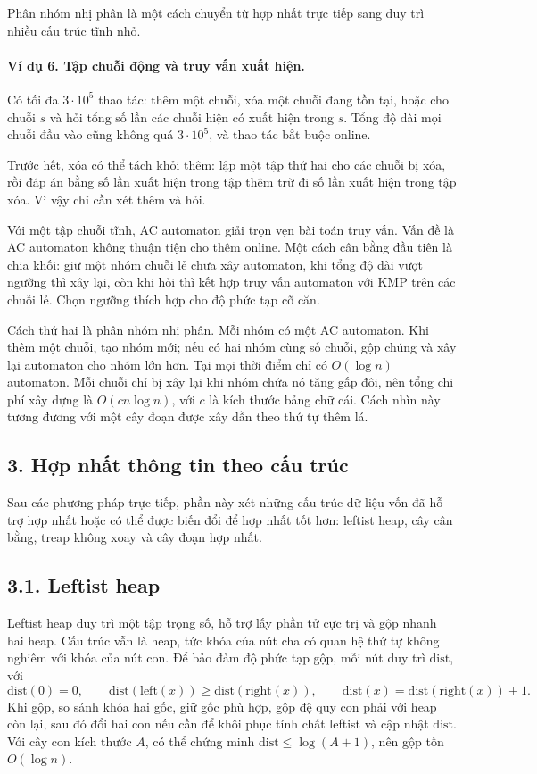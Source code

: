 \documentclass[11pt]{article}
\begin{document}
Phân nhóm nhị phân là một cách chuyển từ hợp nhất trực tiếp sang duy trì nhiều
cấu trúc tĩnh nhỏ.

\paragraph{Ví dụ 6. Tập chuỗi động và truy vấn xuất hiện.}
Có tối đa \(3\cdot 10^5\) thao tác: thêm một chuỗi, xóa một chuỗi đang tồn tại,
hoặc cho chuỗi \(s\) và hỏi tổng số lần các chuỗi hiện có xuất hiện trong
\(s\). Tổng độ dài mọi chuỗi đầu vào cũng không quá \(3\cdot 10^5\), và thao
tác bắt buộc online.

Trước hết, xóa có thể tách khỏi thêm: lập một tập thứ hai cho các chuỗi bị xóa,
rồi đáp án bằng số lần xuất hiện trong tập thêm trừ đi số lần xuất hiện trong
tập xóa. Vì vậy chỉ cần xét thêm và hỏi.

Với một tập chuỗi tĩnh, AC automaton giải trọn vẹn bài toán truy vấn. Vấn đề là
AC automaton không thuận tiện cho thêm online. Một cách cân bằng đầu tiên là
chia khối: giữ một nhóm chuỗi lẻ chưa xây automaton, khi tổng độ dài vượt
ngưỡng thì xây lại, còn khi hỏi thì kết hợp truy vấn automaton với KMP trên các
chuỗi lẻ. Chọn ngưỡng thích hợp cho độ phức tạp cỡ căn.

Cách thứ hai là phân nhóm nhị phân. Mỗi nhóm có một AC automaton. Khi thêm một
chuỗi, tạo nhóm mới; nếu có hai nhóm cùng số chuỗi, gộp chúng và xây lại
automaton cho nhóm lớn hơn. Tại mọi thời điểm chỉ có \(O(\log n)\) automaton.
Mỗi chuỗi chỉ bị xây lại khi nhóm chứa nó tăng gấp đôi, nên tổng chi phí xây
dựng là \(O(cn\log n)\), với \(c\) là kích thước bảng chữ cái. Cách nhìn này
tương đương với một cây đoạn được xây dần theo thứ tự thêm lá.

\subsection*{3. Hợp nhất thông tin theo cấu trúc}

Sau các phương pháp trực tiếp, phần này xét những cấu trúc dữ liệu vốn đã hỗ
trợ hợp nhất hoặc có thể được biến đổi để hợp nhất tốt hơn: leftist heap, cây
cân bằng, treap không xoay và cây đoạn hợp nhất.

\subsection*{3.1. Leftist heap}

Leftist heap duy trì một tập trọng số, hỗ trợ lấy phần tử cực trị và gộp nhanh
hai heap. Cấu trúc vẫn là heap, tức khóa của nút cha có quan hệ thứ tự không
nghiêm với khóa của nút con. Để bảo đảm độ phức tạp gộp, mỗi nút duy trì
\(\mathrm{dist}\), với
\[
  \mathrm{dist}(0)=0,\qquad
  \mathrm{dist}(\mathrm{left}(x))\ge
  \mathrm{dist}(\mathrm{right}(x)),\qquad
  \mathrm{dist}(x)=\mathrm{dist}(\mathrm{right}(x))+1.
\]
Khi gộp, so sánh khóa hai gốc, giữ gốc phù hợp, gộp đệ quy con phải với heap
còn lại, sau đó đổi hai con nếu cần để khôi phục tính chất leftist và cập nhật
\(\mathrm{dist}\). Với cây con kích thước \(A\), có thể chứng minh
\(\mathrm{dist}\le \log(A+1)\), nên gộp tốn \(O(\log n)\).
\end{document}

